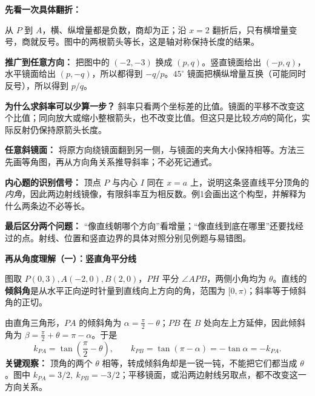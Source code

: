 \clearpage
\begin{explanationbox}
\textbf{先看一次具体翻折：}
\begin{center}

\end{center}
从 $P$ 到 $A$，横、纵增量都是负数，商却为正；沿 $x=2$ 翻折后，只有横增量变号，商就反号。图中的两根箭头等长，这是轴对称保持长度的结果。

\medskip
\textbf{推广到任意方向：} 把图中的 $(-2,-3)$ 换成 $(p,q)$。竖直镜面给出 $(-p,q)$，水平镜面给出 $(p,-q)$，所以都得到 $-q/p$。$45^\circ$ 镜面把横纵增量互换（可能同时反号），所以得到 $p/q$。

\medskip
\textbf{为什么求斜率可以少算一步？} 斜率只看两个坐标差的比值。镜面的平移不改变这个比值；同向放大或缩小整根箭头，也不改变比值。但这只是比较\emph{方向}的简化，实际反射仍保持原箭头长度。

\medskip
\textbf{任意斜镜面：} 将原方向绕镜面翻到另一侧，与镜面的夹角大小保持相等。方法三先画等角图，再从方向角关系推导斜率；不必死记通式。

\medskip
\textbf{内心题的识别信号：} 顶点 $P$ 与内心 $I$ 同在 $x=a$ 上，说明这条竖直线平分顶角的\emph{内角}，因此两边射线镜像，有限斜率互为相反数。例1会画出这个构型，并解释为什么两条边不必等长。

\medskip
\textbf{最后区分两个问题：} “像直线朝哪个方向”看增量；“像直线到底在哪里”还要找经过的点。射线、位置和竖直边界的具体对照分别见例题与易错图。
\end{explanationbox}

\clearpage
\begin{explanationbox}
\textbf{再从角度理解（一）：竖直角平分线}
\begin{center}

\end{center}
图取 $P(0,3),A(-2,0),B(2,0)$，$PH$ 平分 $\angle APB$，两侧小角均为 $\theta$。直线的\textbf{倾斜角}是从水平正向逆时针量到直线向上方向的角，范围为 $[0,\pi)$；斜率等于倾斜角的正切。

\medskip
由直角三角形，$PA$ 的倾斜角为 $\alpha=\frac\pi2-\theta$；$PB$ 在 $B$ 处向左上方延伸，因此倾斜角为 $\beta=\frac\pi2+\theta=\pi-\alpha$。于是
\[
k_{PA}=\tan\!\left(\frac\pi2-\theta\right),\qquad
k_{PB}=\tan(\pi-\alpha)=-\tan\alpha=-k_{PA}.
\]
\textbf{关键观察：} 顶角的两个 $\theta$ 相等，转成倾斜角却是一锐一钝，不能把它们都当成 $\theta$。图中 $k_{PA}=3/2,\ k_{PB}=-3/2$；平移镜面，或沿两边射线另取点，都不改变这一方向关系。
\end{explanationbox}

